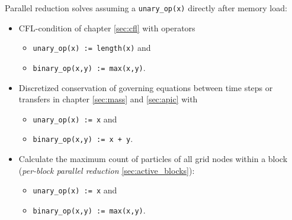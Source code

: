 \documentclass[m,times]{cgMA}
\begin{document}
Parallel reduction solves assuming a \texttt{unary\_op(x)} directly after memory load:
\begin{itemize}
  \item CFL-condition of chapter \ref{sec:cfl} with operators
  \begin{itemize}
  \item \texttt{unary\_op(x) := length(x)} and
  \item \texttt{binary\_op(x,y) := max(x,y)}.
  \end{itemize}
\item Discretized conservation of governing equations between time steps or transfers in chapter \ref{sec:mass} and \ref{sec:apic} with
\begin{itemize}
  \item \texttt{unary\_op(x) := x} and
  \item \texttt{binary\_op(x,y) := x + y}.
  \end{itemize}
\item Calculate the maximum count of particles of all grid nodes within a block (\textit{per-block parallel reduction} \ref{sec:active_blocks}):
\begin{itemize}
  \item \texttt{unary\_op(x) := x} and
  \item \texttt{binary\_op(x,y) := max(x,y)}.
\end{itemize}
\end{itemize}
\end{document}
